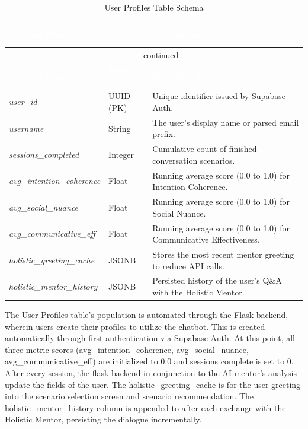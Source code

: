 \begin{longtable}{p{4cm} p{2.5cm} p{8cm}}
\caption{User Profiles Table Schema}
\label{tab:user_profiles} \\

\rowcolor{headerblue}
\textcolor{white}{\textbf{Column Name}} &
\textcolor{white}{\textbf{Data Type}} &
\textcolor{white}{\textbf{Description}} \\
\endfirsthead
\multicolumn{3}{c}{\tablename\ \thetable{} -- continued} \\
\rowcolor{headerblue}
\textcolor{white}{\textbf{Column Name}} &
\textcolor{white}{\textbf{Data Type}} &
\textcolor{white}{\textbf{Description}} \\
\endhead

\midrule
\textit{user\_id} & UUID (PK) & Unique identifier issued by Supabase Auth. \\
\midrule
\textit{username} & String & The user's display name or parsed email prefix. \\
\midrule
\textit{sessions\_completed} & Integer & Cumulative count of finished conversation scenarios. \\
\midrule
\textit{avg\_intention\_coherence} & Float & Running average score (0.0 to 1.0) for Intention Coherence. \\
\midrule
\textit{avg\_social\_nuance} & Float & Running average score (0.0 to 1.0) for Social Nuance. \\
\midrule
\textit{avg\_communicative\_eff} & Float & Running average score (0.0 to 1.0) for Communicative Effectiveness. \\
\midrule
\textit{holistic\_greeting\_cache} & JSONB & Stores the most recent mentor greeting to reduce API calls. \\
\midrule
\textit{holistic\_mentor\_history} & JSONB & Persisted history of the user's Q\&A with the Holistic Mentor. \\
\bottomrule
\end{longtable}

The User Profiles table's population is automated through the Flask backend, wherein users create their profiles to utilize the chatbot. This is
created automatically through first authentication via Supabase Auth. At this point, all three metric scores (avg\_intention\_coherence, avg\_social\_nuance, avg\_communicative\_eff) are initialized to 0.0 and sessions
complete is set to 0. After every session, the flask backend in conjunction to the AI mentor's analysis update the fields of the user. The holistic\_greeting\_cache
is for the user greeting into the scenario selection screen and scenario recommendation. The holistic\_mentor\_history column is appended to after each exchange with the Holistic Mentor, persisting the dialogue incrementally. 

